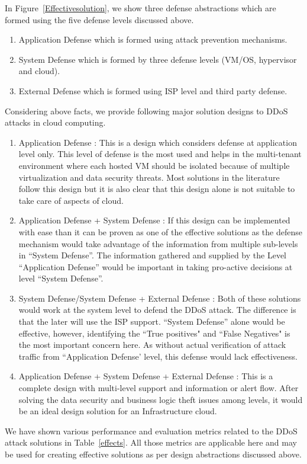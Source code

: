 \documentclass[final,5p,times,twocolumn]{elsarticle}
\begin{document}
{
In Figure~\ref{Effectivesolution}, we show three defense abstractions which are formed using the five defense levels discussed above. 
\begin{enumerate}
\item Application Defense which is formed using attack prevention mechanisms.  
\item System Defense which is formed by three defense levels (VM/OS, hypervisor and cloud).
\item External Defense which is formed using ISP level and third party defense. 
\end{enumerate}
Considering above facts, we provide following major solution designs to DDoS attacks in cloud computing.
\begin{enumerate}
\item Application Defense : This is a design which considers defense at application level only. This level of defense is the most used and helps in the multi-tenant environment where each hosted VM should be isolated because of multiple virtualization and data security threats. Most solutions in the literature follow this design but it is also clear that this design alone is not suitable to take care of aspects of cloud.
\item Application Defense +  System Defense : If this design can be implemented with ease than it can be proven as one of the effective solutions as the defense mechanism would take advantage of the information from multiple sub-levels in ``System Defense''. The information gathered and supplied by the Level ``Application Defense'' would be important in taking pro-active decisions at level ``System Defense''.
\item System Defense/System Defense + External Defense : Both of these solutions would work at the system level to defend the DDoS attack. The difference is that the later will use the ISP support. ``System Defense''  alone would be effective, however, identifying the ``True positives" and ``False Negatives" is the most important concern here. As without actual verification of attack traffic from ``Application Defense' level, this defense would lack effectiveness.
\item Application Defense + System Defense + External Defense : This is a complete design with multi-level support and information or alert flow. After solving the data security and business logic theft issues among levels, it would be an ideal design solution for an Infrastructure cloud.
\end{enumerate}}
{We have shown various performance and evaluation metrics related to the DDoS attack solutions in Table~\ref{effects}. All those metrics are applicable here and may be used for creating effective solutions as per design abstractions discussed above. }
\end{document}
